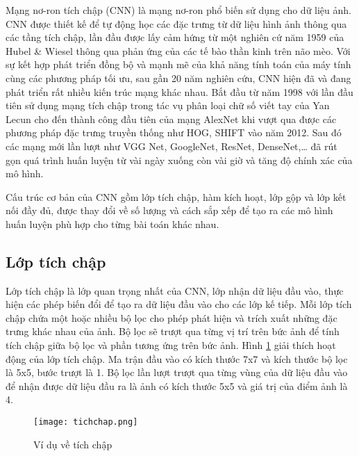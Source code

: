 \documentclass[../the.tex]{subfiles}
\begin{document}
{\fontsize{13}{12} \selectfont

	Mạng nơ-ron tích chập (CNN) là mạng nơ-ron phổ biến sử dụng cho dữ liệu ảnh.
	CNN được thiết kế để tự động học các đặc trưng từ dữ liệu hình ảnh thông qua các tầng tích chập, lần đầu được lấy cảm hứng từ một nghiên cứ năm 1959 của Hubel \& Wiesel \cite{hubel1962receptive} thông qua phản ứng của các tế bào thần kinh trên não mèo. Với sự kết hợp phát triển đồng bộ và mạnh mẽ của khả năng tính toán của máy tính cùng các phương pháp tối ưu,
	sau gần 20 năm nghiên cứu, CNN hiện đã và đang phát triển rất nhiều kiến trúc mạng khác nhau. Bắt đầu từ năm 1998 với lần đầu tiên sử dụng mạng tích chập trong tác vụ phân loại chữ số viết tay của Yan Lecun
	\cite{lecun1998gradient} cho đến thành công đầu tiên của mạng AlexNet khi vượt qua được các phương pháp đặc trưng truyền thống như HOG, SHIFT vào năm 2012. Sau đó các mạng mới lần lượt như VGG Net, GoogleNet, ResNet, DenseNet,\dots
	đã rút gọn quá trình huấn luyện từ vài ngày xuống còn vài giờ và tăng độ chính xác của mô hình.

}

\bigskip

{\fontsize{13}{12} \selectfont

	Cấu trúc cơ bản của CNN gồm lớp tích chập, hàm kích hoạt, lớp gộp và lớp kết nối đầy đủ, được thay đổi về số lượng và cách sắp xếp để tạo ra các mô hình huấn luyện phù hợp cho từng bài toán khác nhau.

}

\subsection{Lớp tích chập}

{\fontsize{13}{12} \selectfont

	Lớp tích chập là lớp quan trọng nhất của CNN, lớp nhận dữ liệu đầu vào, thực hiện các phép biến đổi để tạo ra dữ liệu đầu vào cho các lớp kế tiếp. Mỗi lớp tích chập chứa một hoặc nhiều bộ lọc cho phép phát hiện và trích xuất những đặc trưng khác nhau của ảnh.
	Bộ lọc sẽ trượt qua từng vị trí trên bức ảnh để tính tích chập giữa bộ lọc và phần tương ứng trên bức ảnh.
	Hình \ref{fig:hinh_tichchap} giải thích hoạt động của lớp tích chập. Ma trận đầu vào có kích thước 7x7 và kích thước bộ lọc là 5x5, bước trượt là 1. Bộ lọc lần lượt trượt qua từng vùng của dữ liệu đầu vào để nhận được
	dữ liệu đầu ra là ảnh có kích thước 5x5 và giá trị của điểm ảnh là 4.

}
\begin{figure}[H]
	\centering
	\texttt{[image: tichchap.png]}
	\caption{Ví dụ về tích chập}
	\label{fig:hinh_tichchap}
\end{figure}
\end{document}

